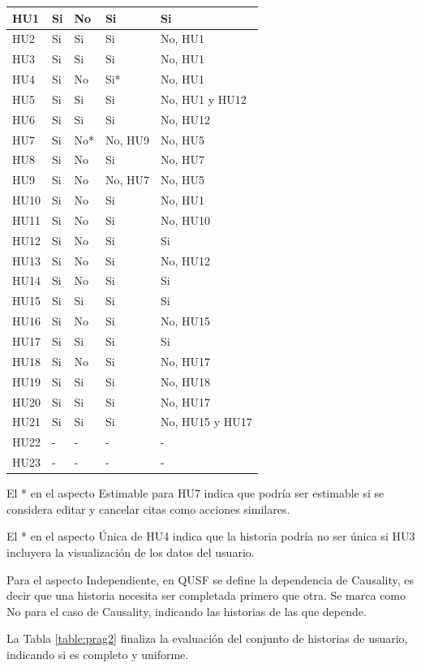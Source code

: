 \begin{longtable}{|l|p{2.7cm}|p{2cm}|p{2cm}|p{2.25cm}|}
HU1 & Si & No & Si  & Si \\ \hline
HU2 & Si & Si & Si & No, HU1 \\ \hline
HU3 & Si & Si & Si & No, HU1  \\ \hline
HU4 & Si & No & Si* & No, HU1  \\ \hline
HU5 & Si & Si & Si &  No, HU1 y HU12  \\ \hline
HU6 & Si & Si & Si &  No, HU12  \\ \hline
HU7 & Si & No* & No, HU9 & No, HU5   \\ \hline
HU8 & Si & No & Si &  No, HU7  \\ \hline
HU9 & Si & No & No, HU7 & No, HU5  \\ \hline
HU10 & Si & No & Si &  No, HU1  \\ \hline
HU11 & Si & No & Si &  No, HU10  \\ \hline
HU12 & Si & No & Si & Si  \\ \hline
HU13 & Si & No & Si & No, HU12   \\ \hline
HU14 & Si & No & Si & Si  \\ \hline
HU15 & Si & Si & Si & Si \\ \hline
HU16 & Si & No & Si & No, HU15  \\ \hline
HU17 & Si & Si & Si & Si   \\ \hline
HU18 & Si & No & Si & No, HU17   \\ \hline
HU19 & Si & Si & Si & No, HU18   \\ \hline
HU20 & Si & Si & Si & No, HU17  \\ \hline
HU21 & Si & Si & Si & No, HU15 y HU17   \\ \hline
HU22 & - & - & - & -  \\ \hline
HU23 & - & - & - & -  \\ \hline
\end{longtable}

El * en el aspecto Estimable para HU7 indica que podría ser estimable si se considera editar y cancelar citas como acciones similares.

El * en el aspecto Única de HU4 indica que la historia podría no ser única si HU3 incluyera la visualización de los datos del usuario.

Para el aspecto Independiente, en QUSF se define la dependencia de Causality, es decir que una historia necesita ser completada primero que otra. Se marca como No para el caso de Causality, indicando las historias de las que depende.

La Tabla \ref{table:prag2} finaliza la evaluación del conjunto de historias de usuario, indicando si es completo y uniforme.

